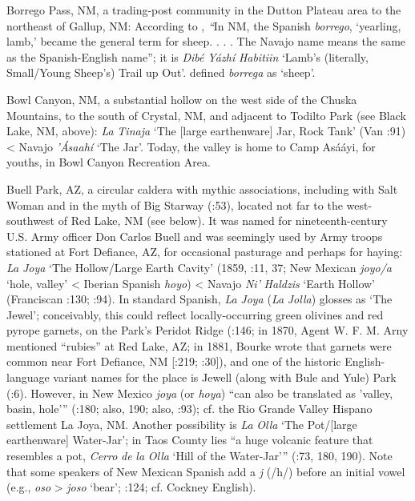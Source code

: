 Borrego Pass, NM, a trading-post community in the Dutton Plateau area to the northeast of Gallup, NM:  According to \citet[46]{Julyan1998}, \textit{“}In NM, the Spanish \textit{borrego}, ‘yearling, lamb,’ became the general term for sheep. . . .  The Navajo name means the same as the Spanish-English name”; it is \textit{Dibé} \textit{Yázhí} \textit{Habitiin} ‘Lamb’s (literally, Small/Young Sheep’s) Trail up Out’.  \citet[7]{Studerus2001} defined \textit{borrega} as ‘sheep’.

Bowl Canyon, NM, a substantial hollow on the west side of the Chuska Mountains, to the south of Crystal, NM, and adjacent to Todilto Park (see Black Lake, NM, above):  \textit{La} \textit{Tinaja} ‘The [large earthenware] Jar, Rock Tank’ (Van \citealt{ValkenburghWalker1945}:91) < Navajo \textit{{}'Ásaahí} ‘The Jar’.  Today, the valley is home to Camp Asááyi, for youths, in Bowl Canyon Recreation Area.

Buell Park, AZ, a circular caldera with mythic associations, including with Salt Woman and in the myth of Big Starway (\citealt{WheelwrightMcAllester1988}:53), located not far to the west-southwest of Red Lake, NM (see below).  It was named for nineteenth-century U.S. Army officer Don Carlos Buell and was seemingly used by Army troops stationed at Fort Defiance, AZ, for occasional pasturage and perhaps for haying:  \textit{La} \textit{Joya} ‘The Hollow/Large Earth Cavity’ (1859, \citealt{Bailey1964a}:11, 37; New Mexican \textit{joyo/a} ‘hole, valley’ < Iberian Spanish \textit{hoyo}) < Navajo \textit{Ni'} \textit{Haldzis} ‘Earth Hollow’ (Franciscan \citealt{Fathers1910}:130; \citealt{Gregory1917}:94).  In standard Spanish, \textit{La} \textit{Joya} (\textit{La} \textit{Jolla}) glosses as ‘The Jewel’; conceivably, this could reflect locally-occurring green olivines and red pyrope garnets, on the Park’s Peridot Ridge (\citealt{Gregory1917}:146; in 1870, Agent W. F. M. Arny mentioned “rubies” at Red Lake, AZ; in 1881, Bourke wrote that garnets were common near Fort Defiance, NM [\citealt{Bloom1936}:219; \citealt{Murphy1967}:30]), and one of the historic English-language variant names for the place is Jewell (along with Bule and Yule) Park (\citealt{BarnesGranger1960}:6).  However, in New Mexico \textit{joya} (or \textit{hoya}) “can also be translated as ’valley, basin, hole’” (\citealt{Julyan1998}:180; also, 190; also, \citealt{Cobos1983}:93); cf. the Rio Grande Valley Hispano settlement La Joya, NM.  Another possibility is \textit{La} \textit{Olla} ‘The Pot/[large earthenware] Water-Jar’; in Taos County lies “a huge volcanic feature that resembles a pot, \textit{Cerro} \textit{de} \textit{la} \textit{Olla} ‘Hill of the Water-Jar’” (\citealt{Julyan1998}:73, 180, 190).  Note that some speakers of New Mexican Spanish add a \textit{j} (/h/) before an initial vowel (e.g., \textit{oso} > \textit{joso} ‘bear’; \citealt{BillsVigil2008}:124; cf. Cockney English).

